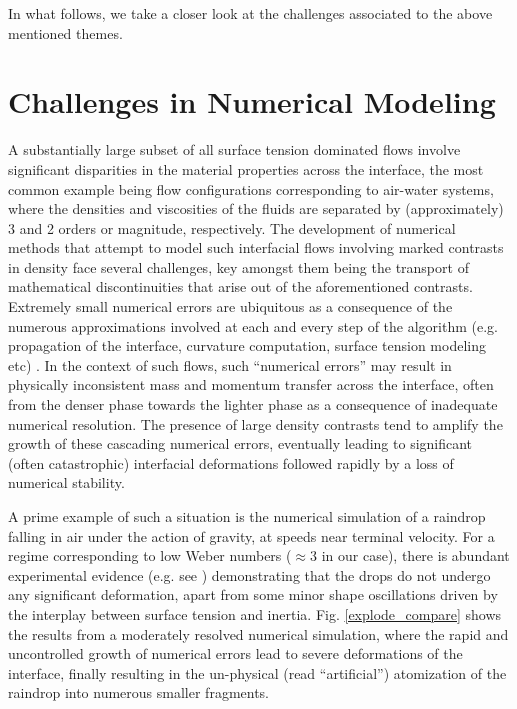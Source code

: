 In what follows, we take a closer look at the challenges associated to the above mentioned themes. 



\section*{Challenges in Numerical Modeling}

A substantially large subset of all surface tension dominated flows 
involve significant disparities in the material properties across 
the interface, the most common example being flow configurations 
corresponding to air-water systems, where the densities and viscosities
of the fluids are separated by (approximately) 3 and 2 orders or magnitude, respectively.  
The development of numerical methods that attempt to model 
such interfacial flows involving marked contrasts in density  
face several challenges, key amongst them being the transport of 
mathematical discontinuities that arise out of the aforementioned contrasts. 
Extremely small numerical errors are ubiquitous as a consequence of the 
numerous approximations involved at each and every step of the algorithm
(e.g. propagation of the interface, curvature computation, surface tension modeling etc) . 
In the context of such flows, such ``numerical errors'' may result in physically
inconsistent mass and momentum transfer across the interface, often from
the denser phase towards the lighter phase as a consequence of inadequate numerical resolution.
The presence of large density contrasts tend to amplify
the growth of these cascading numerical errors, eventually
leading to significant (often catastrophic) interfacial deformations
followed rapidly by a loss of numerical stability.


A prime example of such a situation is the numerical simulation of a 
raindrop falling in air under the action of gravity, at speeds near terminal velocity. 
For a regime corresponding to low Weber numbers ($\approx 3$ in our case), there is abundant experimental evidence 
(e.g. see \cite{drop_breakup}) demonstrating that the drops do not undergo any significant deformation, 
apart from some minor shape oscillations driven by the interplay between surface tension and inertia.  
Fig. \ref{explode_compare} shows the results from a moderately resolved numerical simulation, 
where the rapid and uncontrolled growth of numerical errors lead to severe deformations of the interface, 
finally resulting in the un-physical (read ``artificial'') atomization of the raindrop into numerous smaller fragments.


